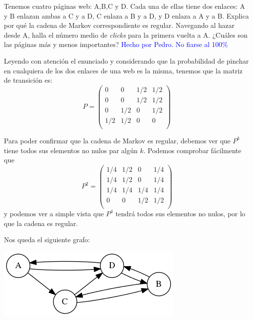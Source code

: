\begin{problem}[6]
Tenemos cuatro páginas web: A,B,C y D. Cada una de ellas tiene dos enlaces: A y B enlazan ambas a C y a D, C enlaza a  B y a D, y D enlaza a A y a B. Explica por qué la cadena de Markov correspondiente es regular. Navegando al hazar desde A, halla el número medio de \textit{clicks} para la primera vuelta a A. ¿Cuáles son las páginas más y menos importantes?
	\solution
	\textcolor{blue}{Hecho por Pedro. No fiarse al 100\%}

	Leyendo con atención el enunciado y considerando que la probabilidad de pinchar en cualquiera de los dos enlaces de una web es la misma, tenemos que la matriz de transición es:
	\[P= \left( \begin{matrix}
	0&0&1/2&1/2\\
	0&0&1/2&1/2\\
	0&1/2&0&1/2\\
	1/2&1/2&0&0\\
	\end{matrix}\right)\]

	Para poder confirmar que la cadena de Markov es regular, debemos ver que $P^k$ tiene todos sus elementos no nulos par algún $k$. Podemos comprobar fácilmente que
	\[P^2= \left( \begin{matrix}
	1/4&1/2&0&1/4\\
	1/4&1/2&0&1/4\\
	1/4&1/4&1/4&1/4\\
	0&0&1/2&1/2\\
	\end{matrix}\right)\]
	y podemos ver a simple vista que $P^4$ tendrá todos sus elementos no nulos, por lo que la cadena es regular.

	Nos queda el siguiente grafo:
	\begin{center}
	\includegraphics{tex/grafo_H2E6.png}
	\end{center}


\end{problem}
